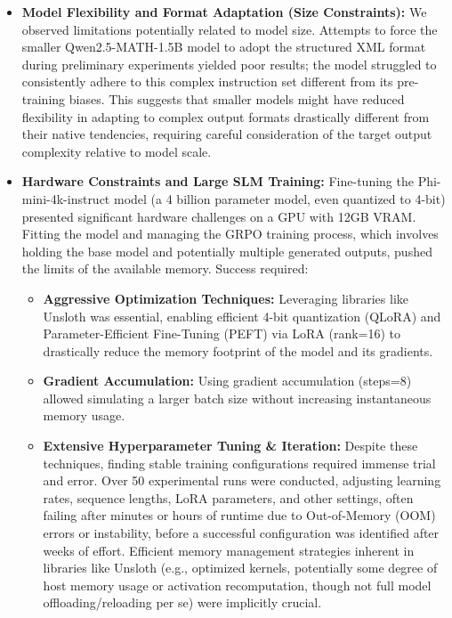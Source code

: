 \documentclass[11pt]{article}
\begin{document}
\begin{itemize}
\begin{itemize}
\begin{itemize}
        \end{itemize}

    \item \textbf{Model Flexibility and Format Adaptation (Size Constraints):} We observed limitations potentially related to model size. Attempts to force the smaller Qwen2.5-MATH-1.5B model to adopt the structured XML format during preliminary experiments yielded poor results; the model struggled to consistently adhere to this complex instruction set different from its pre-training biases. This suggests that smaller models might have reduced flexibility in adapting to complex output formats drastically different from their native tendencies, requiring careful consideration of the target output complexity relative to model scale.

    \item \textbf{Hardware Constraints and Large SLM Training:} Fine-tuning the Phi-mini-4k-instruct model (a 4 billion parameter model, even quantized to 4-bit) presented significant hardware challenges on a GPU with 12GB VRAM. Fitting the model and managing the GRPO training process, which involves holding the base model and potentially multiple generated outputs, pushed the limits of the available memory. Success required:
        \begin{itemize}
            \item \textbf{Aggressive Optimization Techniques:} Leveraging libraries like Unsloth was essential, enabling efficient 4-bit quantization (QLoRA) and Parameter-Efficient Fine-Tuning (PEFT) via LoRA (rank=16) to drastically reduce the memory footprint of the model and its gradients.
            \item \textbf{Gradient Accumulation:} Using gradient accumulation (steps=8) allowed simulating a larger batch size without increasing instantaneous memory usage.
            \item \textbf{Extensive Hyperparameter Tuning \& Iteration:} Despite these techniques, finding stable training configurations required immense trial and error. Over 50 experimental runs were conducted, adjusting learning rates, sequence lengths, LoRA parameters, and other settings, often failing after minutes or hours of runtime due to Out-of-Memory (OOM) errors or instability, before a successful configuration was identified after weeks of effort. Efficient memory management strategies inherent in libraries like Unsloth (e.g., optimized kernels, potentially some degree of host memory usage or activation recomputation, though not full model offloading/reloading per se) were implicitly crucial.
        \end{itemize}


\end{itemize}
\end{itemize}
\end{document}
